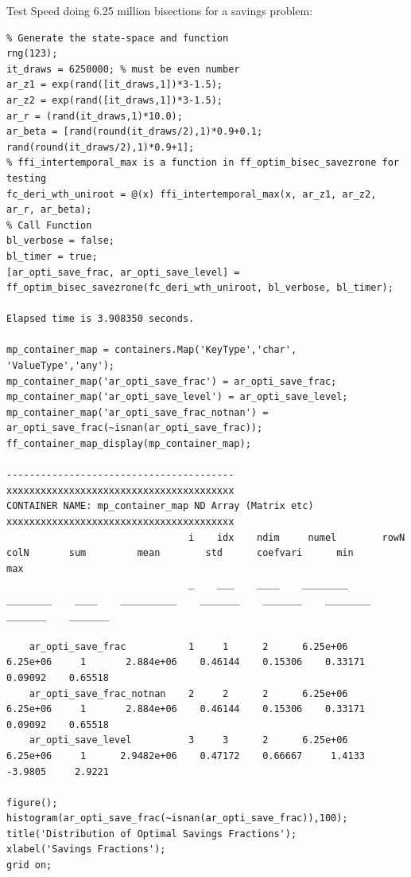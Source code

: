 \documentclass[
]{book}
\begin{document}
Test Speed doing 6.25 million bisections for a savings problem:

\begin{verbatim}
% Generate the state-space and function
rng(123);
it_draws = 6250000; % must be even number
ar_z1 = exp(rand([it_draws,1])*3-1.5);
ar_z2 = exp(rand([it_draws,1])*3-1.5);
ar_r = (rand(it_draws,1)*10.0);
ar_beta = [rand(round(it_draws/2),1)*0.9+0.1; rand(round(it_draws/2),1)*0.9+1]; 
% ffi_intertemporal_max is a function in ff_optim_bisec_savezrone for testing
fc_deri_wth_uniroot = @(x) ffi_intertemporal_max(x, ar_z1, ar_z2, ar_r, ar_beta);
% Call Function
bl_verbose = false;
bl_timer = true;
[ar_opti_save_frac, ar_opti_save_level] = ff_optim_bisec_savezrone(fc_deri_wth_uniroot, bl_verbose, bl_timer);

Elapsed time is 3.908350 seconds.

mp_container_map = containers.Map('KeyType','char', 'ValueType','any');
mp_container_map('ar_opti_save_frac') = ar_opti_save_frac;
mp_container_map('ar_opti_save_level') = ar_opti_save_level;
mp_container_map('ar_opti_save_frac_notnan') = ar_opti_save_frac(~isnan(ar_opti_save_frac));
ff_container_map_display(mp_container_map);

----------------------------------------
xxxxxxxxxxxxxxxxxxxxxxxxxxxxxxxxxxxxxxxx
CONTAINER NAME: mp_container_map ND Array (Matrix etc)
xxxxxxxxxxxxxxxxxxxxxxxxxxxxxxxxxxxxxxxx
                                i    idx    ndim     numel        rowN      colN       sum         mean        std      coefvari      min        max  
                                _    ___    ____    ________    ________    ____    __________    _______    _______    ________    _______    _______

    ar_opti_save_frac           1     1      2      6.25e+06    6.25e+06     1       2.884e+06    0.46144    0.15306    0.33171     0.09092    0.65518
    ar_opti_save_frac_notnan    2     2      2      6.25e+06    6.25e+06     1       2.884e+06    0.46144    0.15306    0.33171     0.09092    0.65518
    ar_opti_save_level          3     3      2      6.25e+06    6.25e+06     1      2.9482e+06    0.47172    0.66667     1.4133     -3.9805     2.9221

figure();
histogram(ar_opti_save_frac(~isnan(ar_opti_save_frac)),100);
title('Distribution of Optimal Savings Fractions');
xlabel('Savings Fractions');
grid on;
\end{verbatim}
\end{document}
